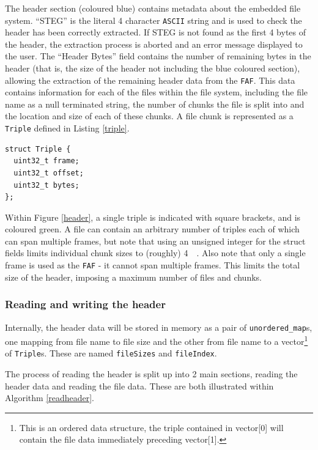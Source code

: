 \documentclass[paper=a4, fontsize=11pt,twoside]{scrartcl}
\numberwithin{table}{section}
\numberwithin{figure}{section}
\numberwithin{algorithm}{section}
\begin{document}
\noindent
The header section (coloured blue) contains metadata about the embedded file system. ``STEG'' is the literal 4 character \texttt{ASCII} string and is used to check the header has been correctly extracted. If STEG is not found as the first 4 bytes of the header, the extraction process is aborted and an error message displayed to the user. The ``Header Bytes'' field contains the number of remaining bytes in the header (that is, the size of the header not including the blue coloured section), allowing the extraction of the remaining header data from the \texttt{FAF}. This data contains information for each of the files within the file system, including the file name as a null terminated string, the number of chunks the file is split into and the location and size of each of these chunks. A file chunk is represented as a \texttt{Triple} defined in Listing \ref{triple}.

\begin{lstlisting}[caption={Triple definition (\texttt{fs/stegfs.h:19})}, frame=single, label=triple]
struct Triple {
  uint32_t frame;
  uint32_t offset;
  uint32_t bytes;
};
\end{lstlisting}

\noindent
Within Figure \ref{header}, a single triple is indicated with square brackets, and is coloured green. A file can contain an arbitrary number of triples each of which can span multiple frames, but note that using an unsigned integer for the struct fields limits individual chunk sizes to (roughly) \SI{4}{\giga\byte}. Also note that only a single frame is used as the \texttt{FAF} - it cannot span multiple frames. This limits the total size of the header, imposing a maximum number of files and chunks.

\subsubsection{Reading and writing the header}

Internally, the header data will be stored in memory as a pair of \texttt{unordered\_map}s, one mapping from file name to file size and the other from file name to a vector\footnote{This is an ordered data structure, the triple contained in vector[0] will contain the file data immediately preceding vector[1].} of \texttt{Triple}s. These are named \texttt{fileSizes} and \texttt{fileIndex}.

The process of reading the header is split up into 2 main sections, reading the header data and reading the file data. These are both illustrated within Algorithm \ref{readheader}.
\end{document}

